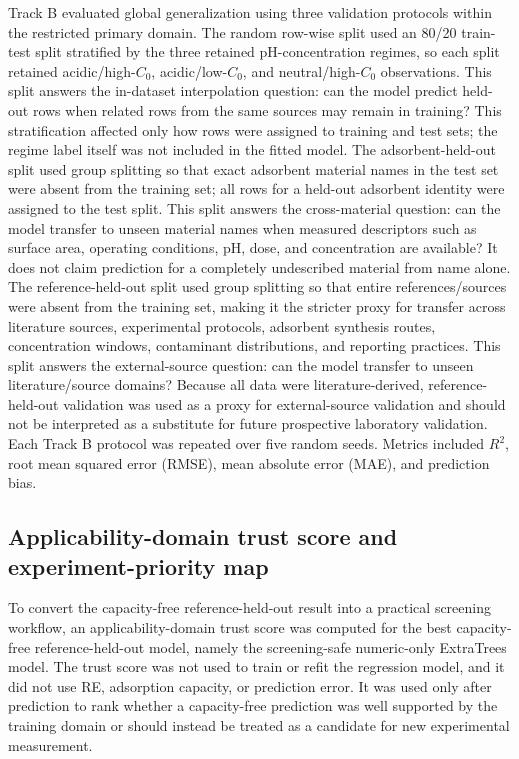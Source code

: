 \documentclass[review,12pt,number]{elsarticle}
\begin{document}
Track B evaluated global generalization using three validation protocols within the restricted primary domain. The random row-wise split used an 80/20 train-test split stratified by the three retained pH-concentration regimes, so each split retained acidic/high-$C_0$, acidic/low-$C_0$, and neutral/high-$C_0$ observations. This split answers the in-dataset interpolation question: can the model predict held-out rows when related rows from the same sources may remain in training? This stratification affected only how rows were assigned to training and test sets; the regime label itself was not included in the fitted model. The adsorbent-held-out split used group splitting so that exact adsorbent material names in the test set were absent from the training set; all rows for a held-out adsorbent identity were assigned to the test split. This split answers the cross-material question: can the model transfer to unseen material names when measured descriptors such as surface area, operating conditions, pH, dose, and concentration are available? It does not claim prediction for a completely undescribed material from name alone. The reference-held-out split used group splitting so that entire references/sources were absent from the training set, making it the stricter proxy for transfer across literature sources, experimental protocols, adsorbent synthesis routes, concentration windows, contaminant distributions, and reporting practices. This split answers the external-source question: can the model transfer to unseen literature/source domains? Because all data were literature-derived, reference-held-out validation was used as a proxy for external-source validation and should not be interpreted as a substitute for future prospective laboratory validation. Each Track B protocol was repeated over five random seeds. Metrics included $R^2$, root mean squared error (RMSE), mean absolute error (MAE), and prediction bias.

\subsection{Applicability-domain trust score and experiment-priority map}

To convert the capacity-free reference-held-out result into a practical screening workflow, an applicability-domain trust score was computed for the best capacity-free reference-held-out model, namely the screening-safe numeric-only ExtraTrees model. The trust score was not used to train or refit the regression model, and it did not use RE, adsorption capacity, or prediction error. It was used only after prediction to rank whether a capacity-free prediction was well supported by the training domain or should instead be treated as a candidate for new experimental measurement.
\end{document}

